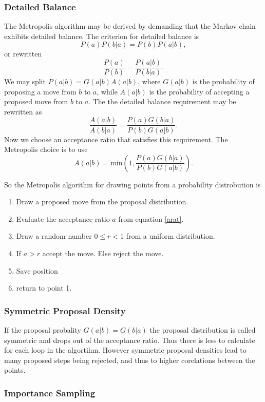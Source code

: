 \documentclass[a4paper,English,10pt]{article}
\newcommand{\be}{\begin{equation}}
\newcommand{\ee}{\end{equation}}
\newcommand{\f}{\frac}
\begin{document}
\subsubsection{Detailed Balance}
The Metropolis algorithm may be derived by demanding that the Markov chain exhibits detailed balance.
The criterion for detailed balance is
\be
P(a)P(b|a) = P(b)P(a|b),
\ee
or rewritten
\be
\f{P(a)}{P(b)} = \f{P(a|b)}{P(b|a)}.
\ee
We may split \(P(a|b) = G(a|b)A(a|b)\), where \(G(a|b)\) is the probability of proposing a move from $b$ to $a$, while
$A(a|b)$ is the probability of accepting a proposed move from $b$ to $a$. The the detailed balance requirement may be rewritten as
\be
\f{A(a|b)}{A(b|a)} = \f{P(a)G(b|a)}{P(b)G(a|b)}.
\ee
Now we choose an acceptance ratio that satisfies this requirement. The Metropolis choice is to use
\be
A(a|b) = \mathrm{min}\left(1,\f{P(a)G(b|a)}{P(b)G(a|b)}\right).\label{arat}
\ee

So the Metropolis algorithm for drawing points from a probability distrobution is
\begin{enumerate}
\item
  Draw a proposed move from the proposal distribution.
\item
  Evaluate the acceptance ratio $a$ from equation \ref{arat}.
\item
  Draw a random number $0 \leq r < 1$ from a uniform distribution.
\item
  If $a>r$ accept the move. Else reject the move.
\item
  Save position
\item
  return to point 1.
\end{enumerate}
  
  

\subsubsection{Symmetric Proposal Density}

If the proposal probality $G(a|b) = G(b|a)$ the proposal distribution is called symmetric and drops out of the acceptance ratio.
Thus there is less to calculate for each loop in the algortihm. However symmetric proposal densities lead to many proposed steps being rejected,
and thus to higher corelations between the points.


\subsubsection{Importance Sampling}
\end{document}
